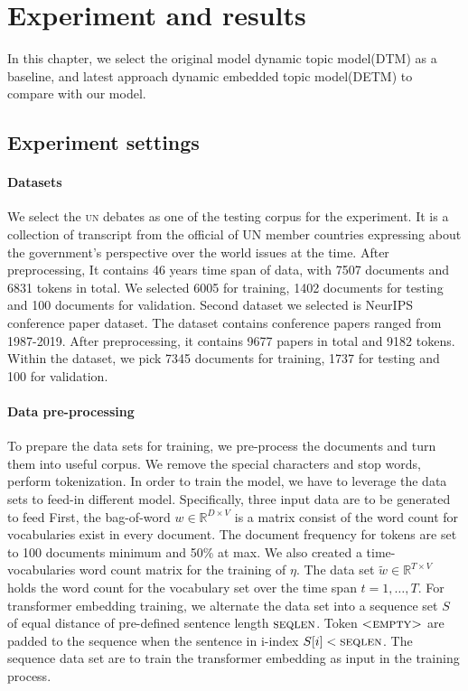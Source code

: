 \section{Experiment and results}
In this chapter, we select the original model dynamic topic model(DTM)\cite{blei_dynamic_2006} as a baseline, and latest approach dynamic embedded topic model(DETM)\cite{dieng_dynamic_2019} to compare with our model.
\subsection{Experiment settings}
\paragraph{Datasets}
We select the \textsc{un} debates as one of the testing corpus for the experiment. It is a collection of transcript from the official of UN member countries expressing about the  government's perspective over the world issues at the time.
After preprocessing, It contains 46 years time span of data, with 7507 documents and 6831 tokens in total. We selected 6005 for training, 1402 documents for testing and 100 documents for validation.
Second dataset we selected is NeurIPS conference paper dataset. The dataset contains conference papers ranged from 1987-2019. After preprocessing, it contains 9677 papers in total and 9182 tokens. Within the dataset, we pick 7345 documents for training, 1737 for testing and 100 for validation.
\paragraph{Data pre-processing}
To prepare the data sets for training, we pre-process the documents and turn them into useful corpus.
We remove the special characters and stop words, perform tokenization. 
In order to train the model, we have to leverage the data sets to feed-in different model. Specifically, three input data are to be generated to feed
First, the bag-of-word $ w\in\mathbb{R}^{D\times V} $ is a matrix consist of the word count for vocabularies exist in every document. The document frequency for tokens are set to 100 documents minimum and 50\% at max.
We also created a time-vocabularies word count matrix for the training of $ \eta $. The data set $ \tilde{w}\in\mathbb{R}^{T\times V} $ holds the word count for the vocabulary set over the time span $ t=1,\dots,T $.
For transformer embedding training, we alternate the data set into a sequence set $ S $ of equal distance of pre-defined sentence length $ \textsc{seqlen} $. Token $ \textsc{<empty>} $ are padded to the sequence when the sentence in i-index $ S[i]<\textsc{seqlen} $. The sequence data set are to train the transformer embedding as input in the training process.
